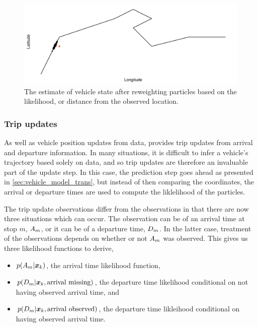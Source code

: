 \begin{knitrout}\small
{}\color{fgcolor}\begin{figure}

{\centering \includegraphics[width=\maxwidth]{figure/pf_wts-1} 

}

\caption[The \pf{} estimate of vehicle state after reweighting particles based on the likelihood, or distance from the observed location]{The \pf{} estimate of vehicle state after reweighting particles based on the likelihood, or distance from the observed location.}\label{fig:pf_wts}
\end{figure}


\end{knitrout}


\subsubsection{Trip updates}
\label{sec:lhood_trip}

As well as vehicle position updates from \GPS{} data, \GTFS{} provides trip updates from arrival and departure information. In many situations, it is difficult to infer a vehicle's trajectory based solely on \GPS{} data, and so trip updates are therefore an invaluable part of the update step. In this case, the \pf{} prediction step goes ahead as presented in \cref{sec:vehicle_model_trans}, but instead of then comparing the coordinates, the arrival or departure times are used to compute the liklelihood of the particles.


The trip update observations differ from the \GPS{} observations in that there are now three situations which can occur. The observation can be of an arrival time at stop $m$, $A_m$, or it can be of a departure time, $D_m$. In the latter case, treatment of the observations depends on whether or not $A_m$ was observed. This gives us three likelihood functions to derive,
\begin{itemize}
\item $p(A_m | \boldsymbol x_k)$, the arrival time likelihood function,
\item $p(D_m | \boldsymbol x_k, \text{arrival missing})$, the departure time likelihood conditional
    on not having observed arrival time, and
\item $p(D_m | \boldsymbol x_k, \text{arrival observed})$, the departure time likleihood conditional
    on having observed arrival time.
\end{itemize}


